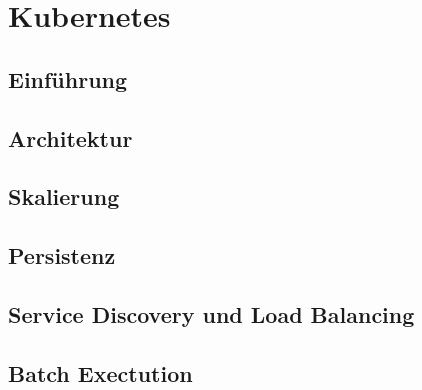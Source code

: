 \chapter{Kubernetes}

\section{Einführung}

\section{Architektur}

\section{Skalierung}

\section{Persistenz}

\section{Service Discovery und Load Balancing}

\section{Batch Exectution}